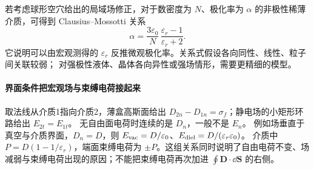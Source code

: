 若考虑球形空穴给出的局域场修正，对于数密度为 $N$、极化率为 $\alpha$ 的非极性稀薄介质，可得到
Clausius--Mossotti 关系
\begin{equation}
  \boxed{\alpha=\frac{3\varepsilon_0}{N}\,
  \frac{\varepsilon_r-1}{\varepsilon_r+2}}.
\end{equation}
它说明可以由宏观测得的 $\varepsilon_r$ 反推微观极化率。关系式假设各向同性、线性、粒子间关联较弱；
对强极性液体、晶体各向异性或强场情形，需要更精细的模型。

\paragraph{界面条件把宏观场与束缚电荷接起来}
取法线从介质1指向介质2，薄盒高斯面给出
$D_{2n}-D_{1n}=\sigma_f$；静电场的小矩形环路给出 $E_{2t}=E_{1t}$。
无自由面电荷时连续的是 $D_n$，一般不是 $E_n$。
例如场垂直于真空与介质界面，$D_n=D$，则 $E_{\rm vac}=D/\varepsilon_0$、$E_{\rm diel}=D/(\varepsilon_r\varepsilon_0)$。
介质中 $P=D(1-1/\varepsilon_r)$，端面束缚电荷为 $\pm P$。这组关系同时说明了自由电荷不变、场减弱与束缚电荷出现的原因；不能把束缚电荷再次加进 $\oint\boldsymbol D\cdot\dd\boldsymbol S$ 的右侧。

